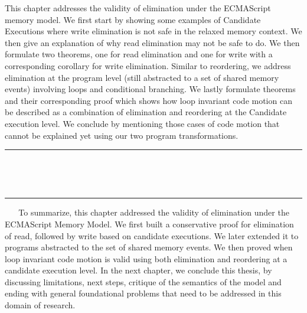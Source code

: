 This chapter addresses the validity of elimination under the ECMAScript memory model.
We first start by showing some examples of Candidate Executions where write elimination is not safe in the relaxed memory context.
We then give an explanation of why read elimination may not be safe to do.   
We then formulate two theorems, one for read elimination and one for write with a corresponding corollary for write elimination. 
Similar to reordering, we address elimination at the program level (still abstracted to a set of shared memory events) involving loops and conditional branching.
We lastly formulate theorems and their corresponding proof which shows how loop invariant code motion can be described as a combination of elimination and reordering at the Candidate execution level. 
We conclude by mentioning those cases of code motion that cannot be explained yet using our two program transformations.
\ \newline
\ \newline  
\hrule 
\ \newline 
\ \newline 









\ \newline
\ \newline  
\hrule 
\ \newline 
\ \newline 
To summarize, this chapter addressed the validity of elimination under the ECMAScript Memory Model. 
We first built a conservative proof for elimination of read, followed by write based on candidate executions.
We later extended it to programs abstracted to the set of shared memory events. 
We then proved when loop invariant code motion is valid using both elimination and reordering at a candidate execution level. 
In the next chapter, we conclude this thesis, by discussing limitations, next steps, critique of the semantics of the model and ending with general foundational problems that need to be addressed in this domain of research. 